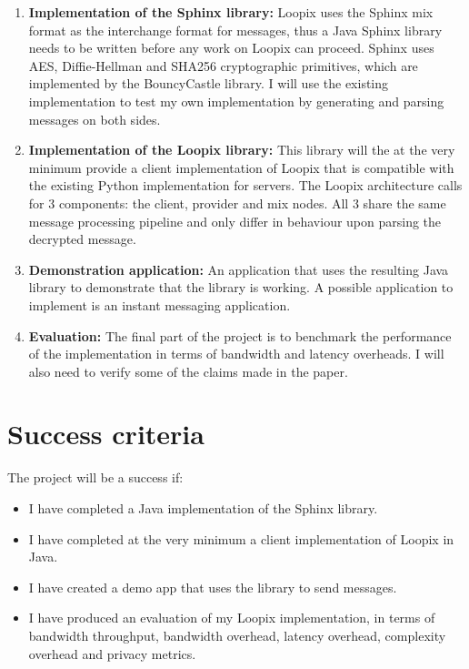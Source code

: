 \documentclass[12pt,a4paper,twoside]{article}
\begin{document}
	\begin{enumerate}
		\item \textbf{Implementation of the Sphinx library:} Loopix uses the Sphinx mix format as the interchange format for messages, thus a Java Sphinx library needs to be written before any work on Loopix can proceed. Sphinx uses AES, Diffie-Hellman and SHA256 cryptographic primitives, which are implemented by the BouncyCastle library. I will use the existing implementation to test my own implementation by generating and parsing messages on both sides.
		\item \textbf{Implementation of the Loopix library:} This library will the at the very minimum provide a client implementation of Loopix that is compatible with the existing Python implementation for servers. The Loopix architecture calls for 3 components: the client, provider and mix nodes. All 3 share the same message processing pipeline and only differ in behaviour upon parsing the decrypted message.
		\item \textbf{Demonstration application:} An application that uses the resulting Java library to demonstrate that the library is working. A possible application to implement is an instant messaging application.
		\item \textbf{Evaluation:} The final part of the project is to benchmark the performance of the implementation in terms of bandwidth and latency overheads. I will also need to verify some of the claims made in the paper.
	\end{enumerate}
	
	\section*{Success criteria}
	
	The project will be a success if:
	
	\begin{itemize}
		\item I have completed a Java implementation of the Sphinx library.
		\item I have completed at the very minimum a client implementation of Loopix in Java.
		\item I have created a demo app that uses the library to send messages.
		\item I have produced an evaluation of my Loopix implementation, in terms of bandwidth throughput, bandwidth overhead, latency overhead, complexity overhead and privacy metrics.
	\end{itemize}
	
\end{document}
